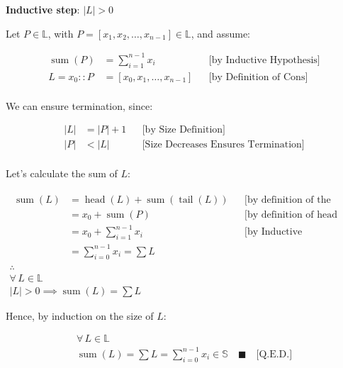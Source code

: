 \textbf{Inductive step}: $|L| > 0$

Let $P \in \mathbb{L}$, with $P = [x_1, x_2, \dots, x_{n-1}] \in \mathbb{L}$,
and assume:

\begin{equation*}
\begin{aligned}
\operatorname{sum}(P) & = \sum_{i=1}^{n-1} x_i && \text{[by Inductive Hypothesis]} \\
L = x_0 :: P & = [x_0, x_1, \dots, x_{n-1}] && \text{[by Definition of Cons]} \\
\end{aligned}
\end{equation*}

We can ensure termination, since:

\begin{equation*}
\begin{aligned}
|L| &= |P| + 1 && \text{[by Size Definition]} \\
|P| &< |L| && \text{[Size Decreases Ensures Termination]} \\
\end{aligned}
\end{equation*}

Let's calculate the sum of $L$:

\begin{gather*}
\begin{aligned}
\operatorname{sum}(L) &= \operatorname{head}(L) + \operatorname{sum}(\operatorname{tail}(L)) && \text{[by definition of the recursive function sum]} \\
&= x_0 + \operatorname{sum}(P) && \text{[by definition of head and P]} \\
&= x_0 + \sum_{i=1}^{n-1} x_i && \text{[by Inductive Hypothesis]} \\
&= \sum_{i=0}^{n-1} x_i = \sum L
\end{aligned} \\
\therefore \\
\forall\, L \in \mathbb{L} \\
|L| > 0 \implies \operatorname{sum}(L) = \sum L
\end{gather*}

Hence, by induction on the size of $L$:

\begin{gather*}
\forall\, L \in \mathbb{L} \\
\operatorname{sum}(L) = \sum L = \sum_{i=0}^{n-1} x_i \in \mathbb{S} \quad \blacksquare \quad \text{[Q.E.D.]}
\end{gather*}

